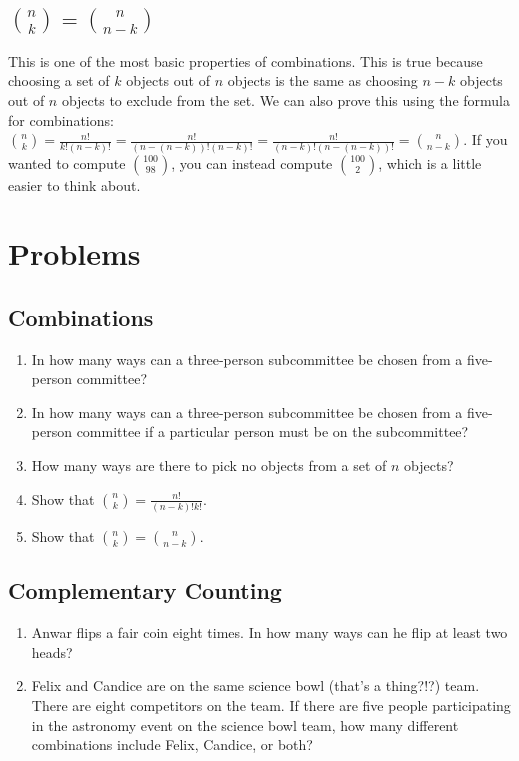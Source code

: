 \documentclass[twocolumn]{article}
\begin{document}
\subsection*{$\binom{n}{k} = \binom{n}{n - k}$}
This is one of the most basic properties of combinations. This is true because 
choosing a set of $k$ objects out of $n$ objects is the same as choosing $n - k$ 
objects out of $n$ objects to exclude from the set. We can also prove this using 
the formula for combinations: $\binom{n}{k} = \frac{n!}{k!(n - k)!} = 
\frac{n!}{(n - (n - k))!(n - k)!} = \frac{n!}{(n - k)!(n - (n - k))!} = 
\binom{n}{n - k}$. If you wanted to compute $\binom{100}{98}$, you can instead 
compute $\binom{100}{2}$, which is a little easier to think about.

\section*{Problems}

\subsection*{Combinations}
\begin{enumerate}
	\item In how many ways can a three-person subcommittee be chosen from a 
		five-person committee?
		\vspace{3cm}
	\item In how many ways can a three-person subcommittee be chosen from a 
		five-person committee if a particular person must be on the 
		subcommittee?
		\vspace{3cm}
	\item How many ways are there to pick no objects from a set of $n$ objects?
		\vspace{3cm}
	\item Show that $\binom{n}{k} = \frac{n!}{(n - k)!k!}$.
		\vspace{3cm}
	\item Show that $\binom{n}{k} = \binom{n}{n - k}$.
		\vspace{3cm}
\end{enumerate}

\subsection*{Complementary Counting}
\begin{enumerate}[resume]
	\item Anwar flips a fair coin eight times. In how many ways can he flip at 
		least two heads?
		\vspace{3cm}
	\item Felix and Candice are on the same science bowl (that's a thing?!?) 
		team. There are eight competitors on the team. If there are five people 
		participating in the astronomy event on the science bowl team, how many 
		different combinations include Felix, Candice, or both?
		\vspace{3cm}
\end{enumerate}
\end{document}
